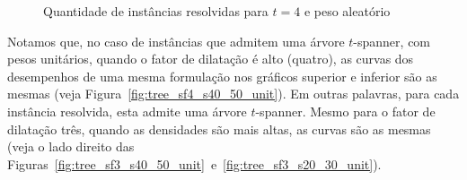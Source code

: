 \begin{figure}%
    \centering
    \caption{Quantidade de instâncias resolvidas para $t = 4$ e peso aleatório}%
    \label{fig:tree_sf4_s20_50_random}%
\end{figure}


Notamos que, no caso de instâncias que admitem uma árvore $t$-spanner,
com pesos unitários, quando o fator de dilatação é alto (quatro), as
curvas dos desempenhos de uma mesma formulação nos gráficos superior e
inferior são as mesmas (veja
Figura~\ref{fig:tree_sf4_s40_50_unit}). Em outras palavras, para cada
instância resolvida, esta admite uma árvore $t$-spanner. Mesmo para o
fator de dilatação três, quando as densidades são mais altas, as curvas são as
mesmas (veja o lado direito das
Figuras~\ref{fig:tree_sf3_s40_50_unit}~e~\ref{fig:tree_sf3_s20_30_unit}).

